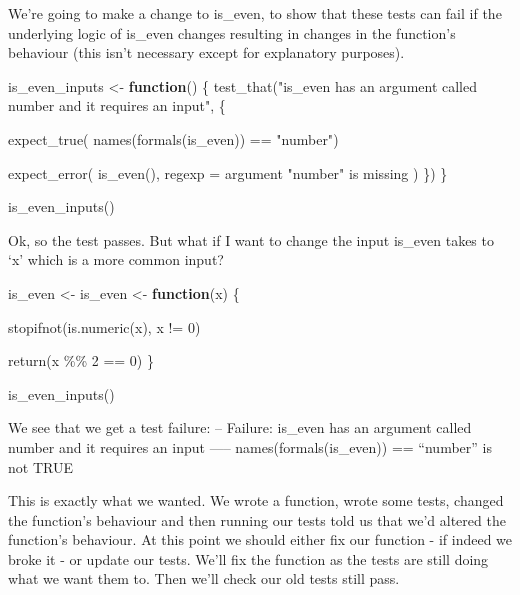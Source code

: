 \documentclass[
  letterpaper,
  DIV=11,
  numbers=noendperiod]{scrreprt}
\newenvironment{Shaded}{\begin{snugshade}}{\end{snugshade}}
\newcommand{\AttributeTok}[1]{\textcolor[rgb]{0.40,0.45,0.13}{#1}}
\newcommand{\ControlFlowTok}[1]{\textcolor[rgb]{0.00,0.23,0.31}{\textbf{#1}}}
\newcommand{\DecValTok}[1]{\textcolor[rgb]{0.68,0.00,0.00}{#1}}
\newcommand{\FunctionTok}[1]{\textcolor[rgb]{0.28,0.35,0.67}{#1}}
\newcommand{\NormalTok}[1]{\textcolor[rgb]{0.00,0.23,0.31}{#1}}
\newcommand{\OtherTok}[1]{\textcolor[rgb]{0.00,0.23,0.31}{#1}}
\newcommand{\SpecialCharTok}[1]{\textcolor[rgb]{0.37,0.37,0.37}{#1}}
\newcommand{\StringTok}[1]{\textcolor[rgb]{0.13,0.47,0.30}{#1}}
\begin{document}
We're going to make a change to is\_even, to show that these tests can
fail if the underlying logic of is\_even changes resulting in changes in
the function's behaviour (this isn't necessary except for explanatory
purposes).

\begin{Shaded}
\begin{Highlighting}[]
\NormalTok{is\_even\_inputs }\OtherTok{\textless{}{-}} \ControlFlowTok{function}\NormalTok{() \{}
  \FunctionTok{test\_that}\NormalTok{(}\StringTok{"is\_even has an argument called number and it requires an input"}\NormalTok{, \{}
    
    \FunctionTok{expect\_true}\NormalTok{(}
      \FunctionTok{names}\NormalTok{(}\FunctionTok{formals}\NormalTok{(is\_even)) }\SpecialCharTok{==} \StringTok{"number"}\NormalTok{)}
    
    \FunctionTok{expect\_error}\NormalTok{(}
      \FunctionTok{is\_even}\NormalTok{(),}
      \AttributeTok{regexp =} \StringTok{\textquotesingle{}argument "number" is missing\textquotesingle{}}
\NormalTok{    )}
\NormalTok{  \})}
\NormalTok{\}}


\FunctionTok{is\_even\_inputs}\NormalTok{()}
\end{Highlighting}
\end{Shaded}

Ok, so the test passes. But what if I want to change the input is\_even
takes to `x' which is a more common input?

\begin{Shaded}
\begin{Highlighting}[]
\NormalTok{is\_even }\OtherTok{\textless{}{-}}\NormalTok{ is\_even }\OtherTok{\textless{}{-}} \ControlFlowTok{function}\NormalTok{(x) \{}
  
  \FunctionTok{stopifnot}\NormalTok{(}\FunctionTok{is.numeric}\NormalTok{(x), x }\SpecialCharTok{!=} \DecValTok{0}\NormalTok{)}
  
  \FunctionTok{return}\NormalTok{(x }\SpecialCharTok{\%\%} \DecValTok{2} \SpecialCharTok{==} \DecValTok{0}\NormalTok{)}
\NormalTok{\}}

\FunctionTok{is\_even\_inputs}\NormalTok{()}
\end{Highlighting}
\end{Shaded}

We see that we get a test failure: -- Failure: is\_even has an argument
called number and it requires an input ----- names(formals(is\_even)) ==
``number'' is not TRUE

This is exactly what we wanted. We wrote a function, wrote some tests,
changed the function's behaviour and then running our tests told us that
we'd altered the function's behaviour. At this point we should either
fix our function - if indeed we broke it - or update our tests. We'll
fix the function as the tests are still doing what we want them to. Then
we'll check our old tests still pass.
\end{document}
